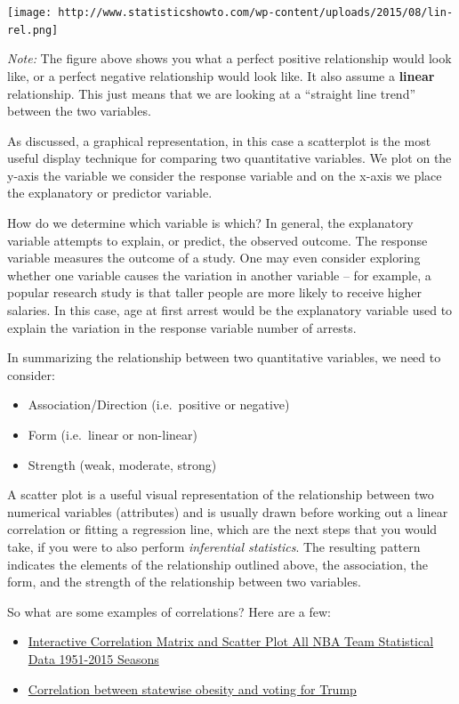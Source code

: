 \documentclass[
]{book}
\providecommand{\tightlist}{%
  \setlength{\itemsep}{0pt}\setlength{\parskip}{0pt}}
\begin{document}
\texttt{[image: http://www.statisticshowto.com/wp-content/uploads/2015/08/lin-rel.png]}

\emph{Note:}
The figure above shows you what a perfect positive relationship would look like, or a perfect negative relationship would look like. It also assume a \textbf{linear} relationship. This just means that we are looking at a ``straight line trend'' between the two variables.

As discussed, a graphical representation, in this case a scatterplot is the most useful display technique for comparing two quantitative variables. We plot on the y-axis the variable we consider the response variable and on the x-axis we place the explanatory or predictor variable.

How do we determine which variable is which? In general, the explanatory variable attempts to explain, or predict, the observed outcome. The response variable measures the outcome of a study. One may even consider exploring whether one variable causes the variation in another variable -- for example, a popular research study is that taller people are more likely to receive higher salaries. In this case, age at first arrest would be the explanatory variable used to explain the variation in the response variable number of arrests.

In summarizing the relationship between two quantitative variables, we need to consider:

\begin{itemize}
\tightlist
\item
  Association/Direction (i.e.~positive or negative)
\item
  Form (i.e.~linear or non-linear)
\item
  Strength (weak, moderate, strong)
\end{itemize}

A scatter plot is a useful visual representation of the relationship between two numerical variables (attributes) and is usually drawn before working out a linear correlation or fitting a regression line, which are the next steps that you would take, if you were to also perform \emph{inferential statistics}. The resulting pattern indicates the elements of the relationship outlined above, the association, the form, and the strength of the relationship between two variables.

So what are some examples of correlations? Here are a few:

\begin{itemize}
\tightlist
\item
  \href{http://asbcllc.com/blog/2014/december/nba_team_corr_matrix/scaled/}{Interactive Correlation Matrix and Scatter Plot All NBA Team Statistical Data 1951-2015 Seasons}
\item
  \href{https://fsmedia.imgix.net/af/f3/d7/f5/b2df/470f/8f8c/4b41daf55348/the-correlation-between-trump-voters-and-obesity-has-a-strong-positive-correlation-at-0717.png}{Correlation between statewise obesity and voting for Trump}
\end{itemize}
\end{document}
